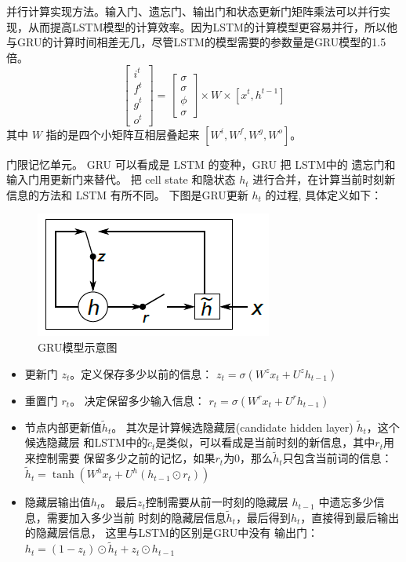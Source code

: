 {并行计算实现方法}。输入门、遗忘门、输出门和状态更新门矩阵乘法可以并行实现，从而提高LSTM模型的计算效率。因为LSTM的计算模型更容易并行，所以他与GRU的计算时间相差无几，尽管LSTM的模型需要的参数量是GRU模型的1.5倍。
\begin{equation}\label{equ:lstm}
\begin{bmatrix} i^t\\ f^t\\g^t\\o^t \end{bmatrix} =\begin{bmatrix}\sigma\\ \sigma\\\phi\\\sigma\end{bmatrix}\times W\times[x^t,h^{t-1}]
\end{equation}
其中 $W$ 指的是四个小矩阵互相层叠起来 $[W^i,W^f,W^g,W^o]$。




{门限记忆单元。} GRU 可以看成是 LSTM 的变种，GRU 把 LSTM中的 遗忘门和输入门用更新门来替代。 把 cell state 和隐状态 $h_t$ 进行合并，在计算当前时刻新信息的方法和 LSTM 有所不同。 下图是GRU更新 $h_t$ 的过程, 具体定义如下：
\begin{figure}[!h]
  \centering
  \includegraphics[width=0.45\linewidth]{./figures/gru.png}
  \caption{GRU模型示意图}\label{fig:gru}
\end{figure}

\begin{itemize}
\item 更新门 $z_t$。定义保存多少以前的信息： $z_t = \sigma ( W^z x_t+ U^z h_{t-1}  )$

\item 重置门 $r_t$。 决定保留多少输入信息： $r_t = \sigma(W^r x_t  + U^r h_{t-1}  )$

\item 节点内部更新值$\tilde h_t $。 其次是计算候选隐藏层(candidate hidden layer) $\tilde h_t$，这个候选隐藏层 和LSTM中的$\tilde c_t$是类似，可以看成是当前时刻的新信息，其中$r_t$用来控制需要 保留多少之前的记忆，如果$r_t$为0，那么$\tilde h_t$只包含当前词的信息：$\tilde h_t  = \tanh (W^h x_t  + U^h(h_{t-1} \odot r_t) )$

\item 隐藏层输出值$h_t$。 最后$z_t$控制需要从前一时刻的隐藏层 $h_{t-1}$ 中遗忘多少信息，需要加入多少当前 时刻的隐藏层信息$\tilde h_t$，最后得到$h_t$，直接得到最后输出的隐藏层信息， 这里与LSTM的区别是GRU中没有 输出门：$h_t = (1-z_t)\odot \tilde h_t  + z_t \odot h_{t-1}$
\end{itemize}

